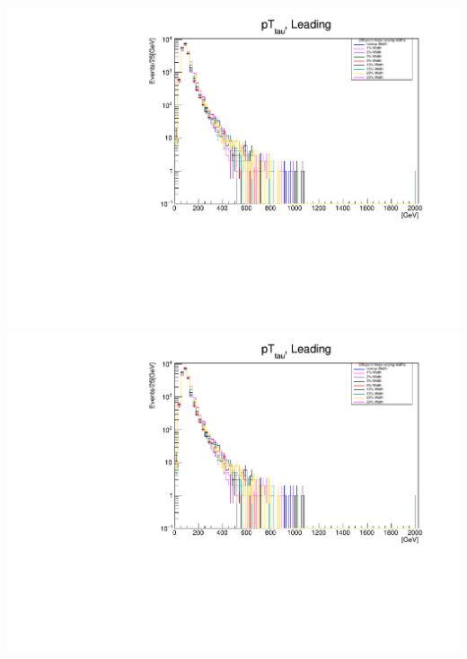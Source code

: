 \documentclass[a4wide,10pt]{article}
\begin{document}
\includegraphics[scale=0.50,page=13]{../Pdfs/Leading_tau_TransverseMomentum_VaryingWidths.pdf}
\includegraphics[scale=0.50,page=14]{../Pdfs/Leading_tau_TransverseMomentum_VaryingWidths.pdf}
\end{document}

